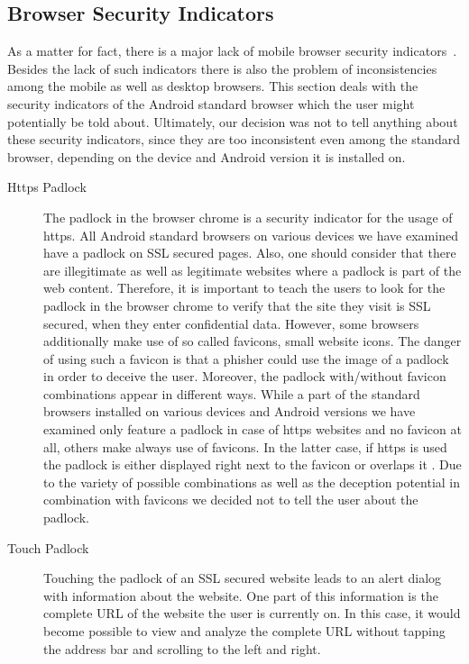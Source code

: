 \subsection{Browser Security Indicators}
As a matter for fact, there is a major lack of mobile browser security indicators~\cite{amrutkar2012measuring,trusteer2011}. 
Besides the lack of such indicators there is also the problem of inconsistencies among the mobile as well as desktop browsers.
This section deals with the security indicators of the Android standard browser which the user might potentially be told about.
Ultimately, our decision was not to tell anything about these security indicators, since they are too inconsistent even among the standard browser, depending on the device and Android version it is installed on.
\begin{description}
		\item[Https Padlock] The padlock in the browser chrome is a security indicator for the usage of https.
All Android standard browsers on various devices we have examined have a padlock on SSL secured pages.
Also, one should consider that there are illegitimate as well as legitimate websites where a padlock is part of the web content. 
Therefore, it is important to teach the users to look for the padlock in the browser chrome to verify that the site they visit is SSL secured, when they enter confidential data.
However, some browsers additionally make use of so called favicons, small website icons.
The danger of using such a favicon is that a phisher could use the image of a padlock~\cite{trusteer2011} in order to deceive the user.
Moreover, the padlock with/without favicon combinations appear in different ways. 
While a part of the standard browsers installed on various devices and Android versions we have examined only feature a padlock in case of https websites and no favicon at all, others make always use of favicons. 
In the latter case, if https is used the padlock is either displayed right next to the favicon or overlaps it .
Due to the variety of possible combinations as well as the deception potential in combination with favicons we decided not to tell the user about the padlock.
		\item[Touch Padlock] Touching the padlock of an SSL secured website leads to an alert dialog with information about the website. 
One part of this information is the complete URL of the website the user is currently on.
In this case, it would become possible to view and analyze the complete URL without tapping the address bar and scrolling to the left and right.

\end{description}
